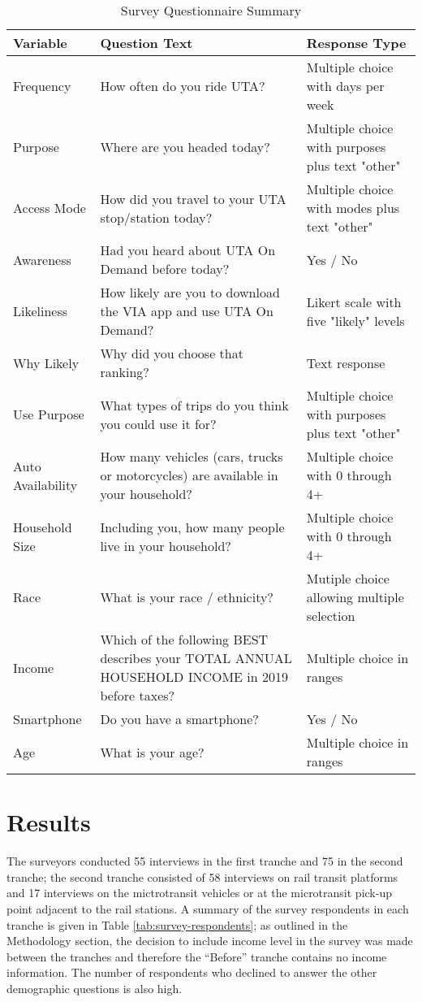 \documentclass[smartcities,article,submit,moreauthors,pdftex]{Definitions/mdpi}
\begin{document}
\begin{table}[ht]
\renewcommand{\arraystretch}{1.5}
    \centering
    \caption{Survey Questionnaire Summary}
    \label{tab:survey-summary}
\begin{tabular}[t]{lp{}p{}}
\toprule
Variable & Question Text & Response Type\\
\midrule
Frequency & How often do you ride UTA? & Multiple choice with days per week\\
Purpose & Where are you headed today? & Multiple choice with purposes plus text "other"\\
Access Mode & How did you travel to your UTA stop/station today? & Multiple choice with modes plus text "other"\\
Awareness & Had you heard about UTA On Demand before today? & Yes / No\\
Likeliness & How likely are you to download the VIA app and use UTA On Demand? & Likert scale with five "likely" levels\\
\addlinespace
Why Likely & Why did you choose that ranking? & Text response\\
Use Purpose & What types of trips do you think you could use it for? & Multiple choice with purposes plus text "other"\\
Auto Availability & How many vehicles (cars, trucks or motorcycles) are available in your household? & Multiple choice with 0 through 4+\\
Household Size & Including you, how many people live in your household? & Multiple choice with 0 through 4+\\
Race & What is your race / ethnicity? & Mutiple choice allowing multiple selection\\
\addlinespace
Income & Which of the following BEST describes your TOTAL ANNUAL HOUSEHOLD INCOME in 2019 before taxes? & Multiple choice in ranges\\
Smartphone & Do you have a smartphone? & Yes / No\\
Age & What is your age? & Multiple choice in ranges\\
\bottomrule
\end{tabular}
\end{table}

\section{Results}

The surveyors conducted 55 interviews in the first tranche and 75 in the second tranche; the second tranche consisted of 58 interviews on rail transit platforms and 17 interviews on the mictrotransit vehicles or at the microtransit pick-up point adjacent to the rail stations. A summary of the survey respondents in each tranche is given in Table \ref{tab:survey-respondents}; as outlined in the Methodology section, the decision to include income level in the survey was made between the tranches and therefore the “Before” tranche contains no income information. The number of respondents who declined to answer the other demographic questions is also high.
\end{document}
